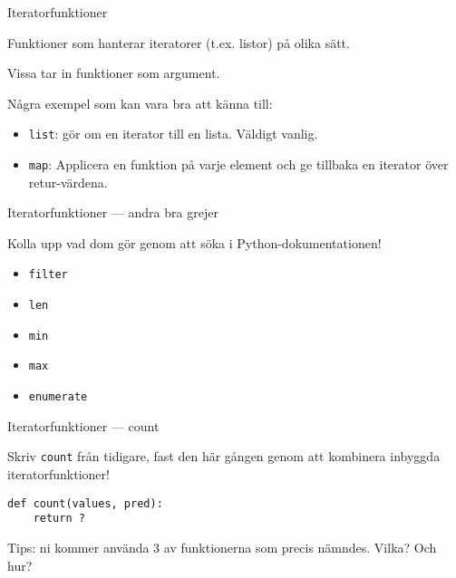 \documentclass{beamer}
\begin{document}
  \begin{frame}{Iteratorfunktioner}

    Funktioner som hanterar iteratorer (t.ex. listor) på olika sätt.

    Vissa tar in funktioner som argument.

    Några exempel som kan vara bra att känna till:

    \begin{itemize}

      \item \texttt{list}: gör om en iterator till en lista. Väldigt vanlig.

      \item \texttt{map}: Applicera en funktion på varje element och ge tillbaka
      en iterator över retur-värdena.

    \end{itemize}

  \end{frame}

  \begin{frame}{Iteratorfunktioner --- andra bra grejer}

    Kolla upp vad dom gör genom att söka i Python-dokumentationen!

    \begin{itemize}
      \item \texttt{filter}
      \item \texttt{len}
      \item \texttt{min}
      \item \texttt{max}
      \item \texttt{enumerate}
    \end{itemize}

  \end{frame}

  \begin{frame}[fragile]{Iteratorfunktioner --- count}

    Skriv \texttt{count} från tidigare, fast den här gången genom att kombinera
    inbyggda iteratorfunktioner!

    \pause{}

    \begin{lstlisting}
def count(values, pred):
    return ?
    \end{lstlisting}

    \pause{}

    Tips: ni kommer använda 3 av funktionerna som precis nämndes. Vilka? Och
    hur?

  \end{frame}
\end{document}
